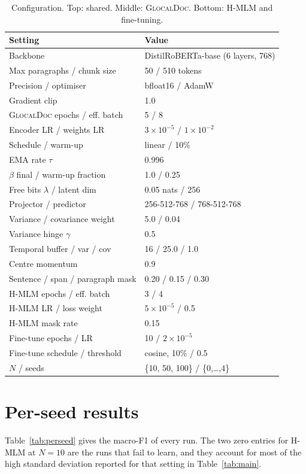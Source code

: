 \documentclass[conference]{IEEEtran}
\newcommand{\glocal}{\textsc{GlocalDoc}}
\newcommand{\hmlm}{\mbox{H-MLM}}
\begin{document}
\begin{table}[t]
\centering
\caption{Configuration. Top: shared. Middle: \glocal{}. Bottom: \hmlm{} and
fine-tuning.}
\label{tab:hparams}
\footnotesize
\begin{tabular}{l l}
\toprule
Setting & Value \\
\midrule
Backbone & DistilRoBERTa-base (6 layers, 768) \\
Max paragraphs / chunk size & 50 / 510 tokens \\
Precision / optimiser & bfloat16 / AdamW \\
Gradient clip & 1.0 \\
\midrule
\glocal{} epochs / eff. batch & 5 / 8 \\
Encoder LR / weights LR & $3\!\times\!10^{-5}$ / $1\!\times\!10^{-2}$ \\
Schedule / warm-up & linear / 10\% \\
EMA rate $\tau$ & 0.996 \\
$\beta$ final / warm-up fraction & 1.0 / 0.25 \\
Free bits $\lambda$ / latent dim & 0.05 nats / 256 \\
Projector / predictor & 256-512-768 / 768-512-768 \\
Variance / covariance weight & 5.0 / 0.04 \\
Variance hinge $\gamma$ & 0.5 \\
Temporal buffer / var / cov & 16 / 25.0 / 1.0 \\
Centre momentum & 0.9 \\
Sentence / span / paragraph mask & 0.20 / 0.15 / 0.30 \\
\midrule
\hmlm{} epochs / eff. batch & 3 / 4 \\
\hmlm{} LR / loss weight & $5\!\times\!10^{-5}$ / 0.5 \\
\hmlm{} mask rate & 0.15 \\
Fine-tune epochs / LR & 10 / $2\!\times\!10^{-5}$ \\
Fine-tune schedule / threshold & cosine, 10\% / 0.5 \\
$N$ / seeds & \{10, 50, 100\} / \{0,\dots,4\} \\
\bottomrule
\end{tabular}
\end{table}

\section{Per-seed results}
\label{app:perseed}
Table~\ref{tab:perseed} gives the macro-F1 of every run. The two zero entries for
\hmlm{} at $N=10$ are the runs that fail to learn, and they account for most of the
high standard deviation reported for that setting in Table~\ref{tab:main}.
\end{document}
